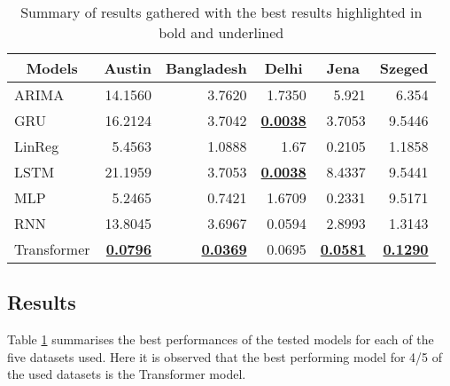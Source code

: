\begin{table}[!ht]
\centering
\caption {Summary of results gathered with the best results highlighted in bold and underlined} \label{tab:ResultsTable} 
\begin{tabular}{|l|r|r|r|r|r|}
\hline
\multicolumn{1}{|c|}{Models} & \multicolumn{1}{c|}{Austin} & \multicolumn{1}{c|}{Bangladesh} & \multicolumn{1}{c|}{Delhi} & \multicolumn{1}{c|}{Jena} & \multicolumn{1}{l|}{Szeged} \\ \hline
ARIMA                        & 14.1560                     & 3.7620                          & 1.7350                     & 5.921                     & 6.354                       \\ \hline
GRU                          & 16.2124                     & 3.7042                          & {\ul \textbf{0.0038}}      & 3.7053                    & 9.5446                      \\ \hline
LinReg                       & 5.4563                      & 1.0888                          & 1.67                       & 0.2105                    & 1.1858                      \\ \hline
LSTM                         & 21.1959                     & 3.7053                          & {\ul \textbf{0.0038}}      & 8.4337                    & 9.5441                      \\ \hline
MLP                          & 5.2465                      & 0.7421                          & 1.6709                     & 0.2331                    & 9.5171                      \\ \hline
RNN                          & 13.8045                     & 3.6967                          & 0.0594                     & 2.8993                    & 1.3143                      \\ \hline
Transformer                  & {\ul \textbf{0.0796}}       & {\ul \textbf{0.0369}}           & 0.0695                     & {\ul \textbf{0.0581}}     & {\ul \textbf{0.1290}}       \\ \hline
\end{tabular}
\end{table}

\subsection{Results}
Table \ref{tab:ResultsTable} summarises the best performances of the tested models for each of the five datasets used. Here it is observed that the best performing model for 4/5 of the used datasets is the Transformer model. 
